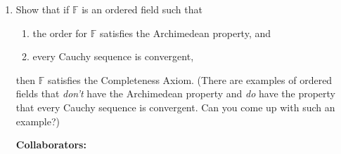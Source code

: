 \documentclass{article}%
\newenvironment{proof}[1][Proof]{\textbf{#1.} }{\ \rule{0.5em}{0.5em}}
\begin{document}
\begin{enumerate}
\bigskip
\textbf{Collaborators:}\\
\smallskip
 
\textbf{Solution:}
\begin{proof}
Let $E$ be a upper-bounded set, and $T$ be the set of all upper bounds of $E$. Construct a function f like this: 
$$
f = \left\{
\begin{aligned} 
1, x\in E \\
-1, x \in T
\end{aligned}
\right.
$$
We assume that $E$ has no supremum. That means $\forall x\in E, \forall \epsilon > 0$(We may assume $x$ is a inner point of $E$), we can find $x_1 > x \in E$, so $\forall x_2 \in (x-\delta, x_1), |f(x_1)-f(x)| = 0 < \epsilon$. So $f$ is continuous on $x$. With the arbitrariness of $x$, $f$ is continuous on $E$. Similarly, $f$ is continuous on $T$. Now we prove that $f$ is continuous on $E\bigcup T$. If not, assume $f$ is not continuous on $x_0$. If $x_0 \in E$, then $f$ should be discontinuous on the right side, which means $\exists \epsilon > 0, \forall \eta > 0, \exists x$, s.t. $|x_0 - x| < \eta, |f(x_0)-f(x)|>\epsilon$. That just means $x_0$ is the supremum of $E$, which makes a contradiction. If $x_0 \in T$, similarly $x_0$ is the supremum of $E$ according to definition. So $f$ is continuous on $E\bigcup T$. Using the property in the problem, for $a \in E, b\in T$, there must exist $x$, s.t. $f(x) = 0$. It contradicts with the construction of $f$. So E has a supremum, which means $\mathcal{F}$ has the least upper bound property.
\end{proof}
\bigskip


\item Show that if $\mathbb{F}$ is an ordered field such that
\begin{enumerate}
\item the order for $\mathbb{F}$ satisfies the Archimedean property, and
\item every Cauchy sequence is convergent, 
\end{enumerate}
then $\mathbb{F}$ satisfies the Completeness Axiom. (There are examples of ordered fields that \emph{don't} have the Archimedean property and \emph{do} have the property that every Cauchy sequence is convergent.  Can you come up with such an example?)


\bigskip
\textbf{Collaborators:}\\
\smallskip
 

\end{enumerate}
\end{document}

